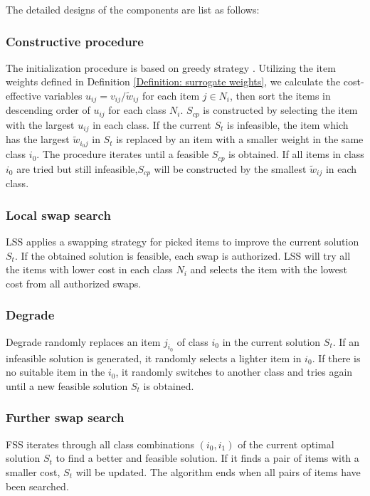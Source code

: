 \documentclass[lettersize,journal]{IEEEtran}
\begin{document}
The detailed designs of the components are list as follows:

\subsubsection{Constructive procedure}
The initialization procedure is based on greedy strategy \cite{kellerer2004multiple}.
Utilizing the item weights defined in Definition \ref{Definition: surrogate weights}, we calculate the cost-effective variables $u_{ij}=v_{ij}/\tilde{w}_{ij}$ for each item $j \in N_i$, then sort the items in descending order of $u_{ij}$ for each class $N_i$. 
$S_{cp}$ is constructed by selecting the item with the largest $u_{ij}$ in each class. 
If the current $S_{t}$ is infeasible,  the item which has the largest $\tilde{w}_{i_0j}$ in $S_t$ is replaced by an item with a smaller weight in the same class $i_0$. 
The procedure iterates until a feasible $S_{cp}$ is obtained.
If all items in class $i_0$ are tried but still infeasible,$S_{cp}$ will be constructed by the smallest $\tilde{w}_{ij}$ in each class.

\subsubsection{Local swap search}
LSS applies a swapping strategy for picked items to improve the current solution $S_t$. 
If the obtained solution is feasible, each swap is authorized. 
LSS will try all the items with lower cost in each class $N_i$ and selects the item with the lowest cost from all authorized swaps. 

\subsubsection{Degrade}
Degrade randomly replaces an item $j_{i_0}$ of class $i_0$ in the current solution $S_t$. 
If an infeasible solution is generated, it randomly selects a lighter item in $i_0$. 
If there is no suitable item in the $i_0$, it randomly switches to another class and tries again until a new feasible solution $S_t$ is obtained.

\subsubsection{Further swap search}
FSS iterates through all class combinations $(i_0,i_1)$ of the current optimal solution $S_t$ to find a better and feasible solution. 
If it finds a pair of items with a smaller cost, $S_t$ will be updated. The algorithm ends when all pairs of items have been searched.
\end{document}
